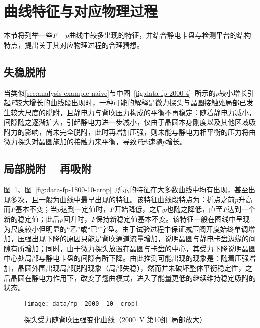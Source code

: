 \clearpage



\section{曲线特征与对应物理过程}\label{sec:analysis-feature}

本节将列举一些$F$ -- $p$曲线中较多出现的特征，并结合静电卡盘与检测平台的结构特点，提出关于其对应物理过程的合理猜想。


\subsection{失稳脱附}\label{sec:analysis-feature-destabilize}

当类似\ref{sec:analysis-example-naive}节中图~\ref{fig:data-fp-2000-4}~所示的$p$较小增长引起$F$较大增长的曲线段出现时，一种可能的解释是微力探头与晶圆接触处局部已发生较大尺度的脱附，且静电力与背吹压力构成的平衡不再稳定：随着静电力减小，间隙随之逐渐扩大，引起静电力进一步减小，仅由于晶圆本身刚度以及其他区域吸附力的影响，尚未完全脱附，此时再增加压强，则未能与静电力相平衡的压力将由微力探头对晶圆施加的接触力来平衡，导致$F$迅速随$p$增长。


\subsection{局部脱附 -- 再吸附}\label{sec:analysis-feature-reattach}

图~\ref{fig:data-fp-2000-10-crop}、图~\ref{fig:data-fp-1800-10-crop}~所示的特征在大多数曲线中均有出现，甚至出现多次，且一般为曲线中最早出现的特征。该特征曲线段特点为：折点之前$p$升高而$F$基本不变；当$p$达到一定值时，$F$开始降低，之后$p$也随之降低，直至$F$达到一个新的稳定值；此后$p$回升时，$F$保持新稳定值基本不变。该特征一般在图线中呈现为尺度较小但明显的“乙”或“已”字型。由于试验过程中保证减压阀开度始终单调增加，压强出现下降的原因只能是背吹通道流量增加，说明晶圆与静电卡盘边缘的间隙有所增加；同时，由于微力探头放置在晶圆与卡盘的中心，其受力下降说明晶圆中心处局部与静电卡盘的间隙有所下降。由此推测可能出现的现象是：随着压强增加，晶圆外围出现局部脱附现象（局部失稳），然而并未破坏整体平衡稳定性，之后晶圆在静电力作用下，改变了翘曲模式，进入了能量更低的继续维持稳定吸附的状态。

\begin{figure}[thbp]
\centering
\texttt{[image: data/fp\_\_2000\_\_10\_\_crop]}
\caption{探头受力随背吹压强变化曲线（\SI{2000}{\V} 第10组\ 局部放大）}
\label{fig:data-fp-2000-10-crop}
\end{figure}


